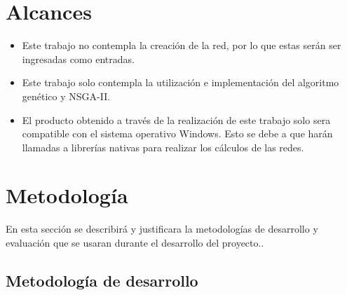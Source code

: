 \documentclass[11pt,letterpaper]{article}
\begin{document}
\section{Alcances}
\begin{itemize}
\item Este trabajo no contempla la creación de la red, por lo que estas serán ser ingresadas como entradas.
\item Este trabajo solo contempla la utilización e implementación del algoritmo genético y NSGA-II.
\item El producto obtenido a través de la realización de este trabajo solo sera compatible con el sistema operativo Windows. Esto se debe a que harán llamadas a librerías nativas para realizar los cálculos de las redes.

\end{itemize}



\section{Metodología}

En esta sección se describirá y justificara la metodologías de desarrollo y evaluación que se usaran durante el desarrollo del proyecto.. 
\subsection{Metodología de desarrollo}

\end{document}
